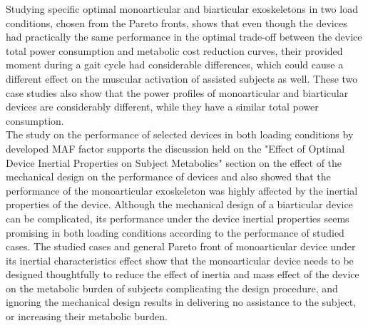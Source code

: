 \documentclass[10pt,letterpaper]{article}
\begin{document}
Studying specific optimal monoarticular and biarticular exoskeletons in two load conditions, chosen from the Pareto fronts, shows that even though the devices had practically the same performance in the optimal trade-off between the device total power consumption and metabolic cost reduction curves, their provided moment during a gait cycle had considerable differences, which could cause a different effect on the muscular activation of assisted subjects as well. These two case studies also show that the power profiles of monoarticular and biarticular devices are considerably different, while they have a similar total power consumption.\\
The study on the performance of selected devices in both loading conditions by developed MAF factor supports the discussion held on the "Effect of Optimal Device Inertial Properties on Subject Metabolics" section on the effect of the mechanical design on the performance of devices and also showed that the performance of the monoarticular exoskeleton was highly affected by the inertial properties of the device. Although the mechanical design of a biarticular device can be complicated, its performance under the device inertial properties seems promising in both loading conditions according to the performance of studied cases. The studied cases and general Pareto front of monoarticular device under its inertial characteristics effect show that the monoarticular device needs to be designed thoughtfully to reduce the effect of inertia and mass effect of the device on the metabolic burden of subjects complicating the design procedure, and ignoring the mechanical design results in delivering no assistance to the subject, or increasing their metabolic burden. 
\end{document}
